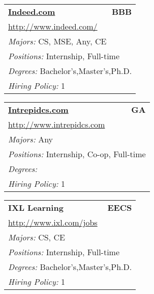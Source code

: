 \documentclass[twoside]{article}
\begin{document}
\begin{center}
\begin{multicols}{3}
\begin{FlushLeft}
\begin{minipage}{.9\columnwidth}
\end{minipage}
 
\begin{minipage}{.9\columnwidth}\begin{tabularx}{.95\columnwidth}{Xr}
                 {\Large\bf \url{Indeed.com}} & {\Large\bf BBB}\\
    \multicolumn{2}{p{.95\columnwidth}}{\url{http://www.indeed.com/}}\\
    \multicolumn{2}{p{.95\columnwidth}}{\emph{Majors:} CS, MSE, Any, CE}\\
    \multicolumn{2}{p{.95\columnwidth}}{\emph{Positions:} Internship, Full-time}\\
    \multicolumn{2}{p{.95\columnwidth}}{\emph{Degrees:} Bachelor's,Master's,Ph.D.}\\
    \multicolumn{2}{p{.95\columnwidth}}{\emph{Hiring Policy:} 1}\\
    \end{tabularx}
    
\end{minipage}
 
\begin{minipage}{.9\columnwidth}\begin{tabularx}{.95\columnwidth}{Xr}
                 {\Large\bf \url{Intrepidcs.com}} & {\Large\bf GA}\\
    \multicolumn{2}{p{.95\columnwidth}}{\url{http://www.intrepidcs.com}}\\
    \multicolumn{2}{p{.95\columnwidth}}{\emph{Majors:} Any}\\
    \multicolumn{2}{p{.95\columnwidth}}{\emph{Positions:} Internship, Co-op, Full-time}\\
    \multicolumn{2}{p{.95\columnwidth}}{\emph{Degrees:} }\\
    \multicolumn{2}{p{.95\columnwidth}}{\emph{Hiring Policy:} 1}\\
    \end{tabularx}
    
\end{minipage}
 
\begin{minipage}{.9\columnwidth}\begin{tabularx}{.95\columnwidth}{Xr}
                 {\Large\bf IXL Learning} & {\Large\bf EECS}\\
    \multicolumn{2}{p{.95\columnwidth}}{\url{http://www.ixl.com/jobs}}\\
    \multicolumn{2}{p{.95\columnwidth}}{\emph{Majors:} CS, CE}\\
    \multicolumn{2}{p{.95\columnwidth}}{\emph{Positions:} Internship, Full-time}\\
    \multicolumn{2}{p{.95\columnwidth}}{\emph{Degrees:} Bachelor's,Master's,Ph.D.}\\
    \multicolumn{2}{p{.95\columnwidth}}{\emph{Hiring Policy:} 1}\\
    \end{tabularx}
    

\end{minipage}
\end{FlushLeft}
\end{multicols}
\end{center}
\end{document}
